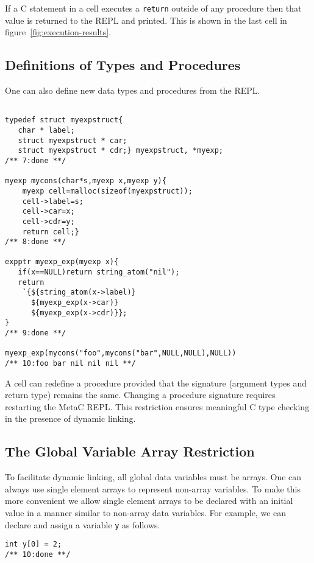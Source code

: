 \documentclass{article}
\begin{document}
If a C statement in a cell executes a {\tt return} outside of any
procedure then that value is returned to the REPL and printed.
This is shown in the last cell in figure~\ref{fig:execution-results}. 

\subsection{Definitions of Types and Procedures}

One can also define new data types and procedures from the REPL.

\begin{verbatim}

typedef struct myexpstruct{
   char * label;
   struct myexpstruct * car;
   struct myexpstruct * cdr;} myexpstruct, *myexp;
/** 7:done **/

myexp mycons(char*s,myexp x,myexp y){
    myexp cell=malloc(sizeof(myexpstruct));
    cell->label=s;
    cell->car=x;
    cell->cdr=y;
    return cell;}
/** 8:done **/

expptr myexp_exp(myexp x){
   if(x==NULL)return string_atom("nil");
   return
    `{${string_atom(x->label)}
      ${myexp_exp(x->car)}
      ${myexp_exp(x->cdr)}};
}
/** 9:done **/

myexp_exp(mycons("foo",mycons("bar",NULL,NULL),NULL))
/** 10:foo bar nil nil nil **/
\end{verbatim}

A cell can redefine a procedure provided that the
signature (argument types and return type) remains the same. Changing a procedure signature
requires restarting the MetaC REPL.  This restriction ensures
meaningful C type checking in the presence of dynamic linking.

\subsection{The Global Variable Array Restriction}

To facilitate dynamic linking, all global data
variables must be arrays. One can always use single element
arrays to represent non-array variables.  To make this more convenient
we allow single element arrays to be declared with an initial value in a
manner similar to non-array data variables.  For example, we can declare and assign a variable {\tt y}
as follows.

\begin{verbatim}
int y[0] = 2;
/** 10:done **/
\end{verbatim}
\end{document}
